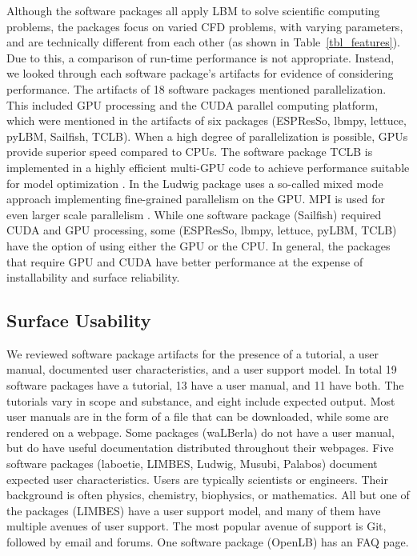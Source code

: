 \documentclass[final, 3p, times, authoryear]{elsarticle}
\begin{document}
Although the software packages all apply LBM to solve scientific computing
problems, the packages focus on varied CFD problems, with varying parameters,
and are technically different from each other (as shown in
Table~\ref{tbl_features}). Due to this, a comparison of run-time performance is
not appropriate. Instead, we looked through each software package's artifacts
for evidence of considering performance. The artifacts of 18 software packages
mentioned parallelization. This included GPU processing and the CUDA parallel
computing platform, which were mentioned in the artifacts of six packages
(ESPResSo, lbmpy, lettuce, pyLBM, Sailfish, TCLB). When a high degree of
parallelization is possible, GPUs provide superior speed compared to CPUs. The
software package TCLB is implemented in a highly efficient multi-GPU code to
achieve performance suitable for model optimization \citep{rutkowski2020open}.
In the Ludwig package uses a so-called mixed mode approach implementing
fine-grained parallelism on the GPU.  MPI is used for even larger scale
parallelism \citep{gray2013ludwig}. While one software package (Sailfish)
required CUDA and GPU processing, some (ESPResSo, lbmpy, lettuce, pyLBM, TCLB)
have the option of using either the GPU or the CPU. In general, the packages
that require GPU and CUDA have better performance at the expense of
installability and surface reliability.

\subsection{Surface Usability}

We reviewed software package artifacts for the presence of a tutorial, a user
manual, documented user characteristics, and a user support model. In total 19
software packages have a tutorial, 13 have a user manual, and 11 have both. The
tutorials vary in scope and substance, and eight include expected output. Most
user manuals are in the form of a file that can be downloaded, while some are
rendered on a webpage. Some packages (waLBerla) do not have a user manual, but
do have useful documentation distributed throughout their webpages. Five
software packages (laboetie, LIMBES, Ludwig, Musubi, Palabos) document expected
user characteristics. Users are typically scientists or engineers. Their
background is often physics, chemistry, biophysics, or mathematics. All but one
of the packages (LIMBES) have a user support model, and many of them have
multiple avenues of user support. The most popular avenue of support is Git,
followed by email and forums. One software package (OpenLB) has an FAQ page.    
\end{document}
